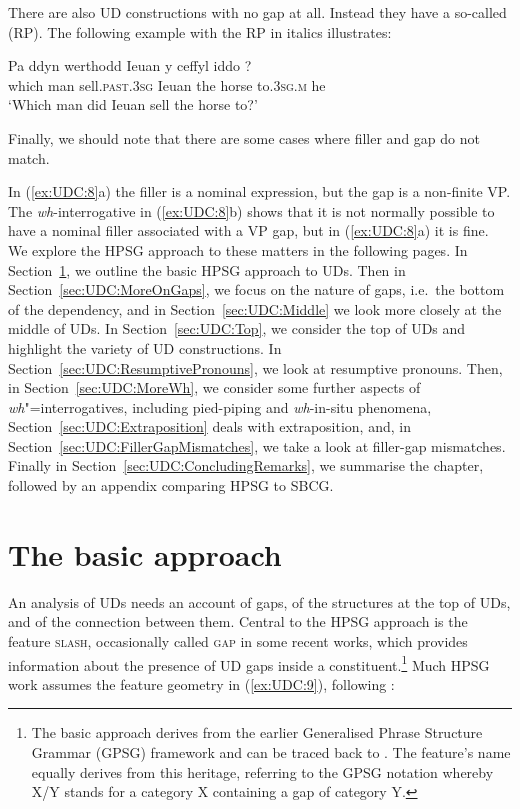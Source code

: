 \documentclass[output=paper,biblatex,babelshorthands,newtxmath,draftmode,colorlinks,citecolor=brown]{langscibook}
\begin{document}
\noindent 
There are also UD constructions with no gap at all. Instead they
have a so-called  (RP). The following 
example with the RP in italics illustrates:

\ea
\label{ex:UDC:7}
\gll Pa    ddyn werthodd               Ieuan y   ceffyl iddo             ?\\
     which man  sell.\textsc{past.3sg} Ieuan the horse  to\textsc{.3sg.m} he\\
\glt `Which man did Ieuan sell the horse to?'
\z

\largerpage
\noindent
Finally, we should note that there are some cases where filler and gap
do not match.

\eal
\label{ex:UDC:8} 
\zl

\noindent 
In (\ref{ex:UDC:8}a) the filler is a nominal expression, but the
gap is a non-finite VP. The \emph{wh}-interrogative in
(\ref{ex:UDC:8}b) shows that it is not normally possible to have a
nominal filler associated with a VP gap, but in (\ref{ex:UDC:8}a) it
is fine.  We explore the HPSG approach to these matters in the
following pages. In Section~\ref{sec:UDC:BasicApproach}, we outline
the basic HPSG approach to UDs. Then in
Section~\ref{sec:UDC:MoreOnGaps}, we focus on the nature of gaps,
i.e.\ the bottom of the dependency, and in Section~\ref{sec:UDC:Middle}
we look more closely at the middle of UDs. In
Section~\ref{sec:UDC:Top}, we consider the top of UDs and highlight
the variety of UD constructions. In
Section~\ref{sec:UDC:ResumptivePronouns}, we look at resumptive
pronouns. Then, in Section~\ref{sec:UDC:MoreWh}, we consider some
further aspects of \emph{wh}"=interrogatives, including pied-piping
and \emph{wh}-in-situ phenomena, Section~\ref{sec:UDC:Extraposition} deals with extraposition, and, in
Section~\ref{sec:UDC:FillerGapMismatches}, we take a look at
filler-gap mismatches.  Finally in
Section~\ref{sec:UDC:ConcludingRemarks}, we summarise the chapter,
followed by an appendix comparing HPSG to SBCG.  

\section{The basic approach}
\label{sec:UDC:BasicApproach} 

An analysis of UDs needs an
account of gaps, of the structures at the top of UDs, and of the
connection between them. Central to the HPSG approach is the feature
\textsc{slash}, occasionally called \textsc{gap} in some recent works,
which provides information about the presence of UD gaps inside a
constituent.\footnote{The basic approach derives from the earlier
  Generalised Phrase Structure Grammar (GPSG) framework
  \citep*{Gazdar85} and can be traced back to \citet{gazdar_g81}. The
  feature's name equally derives from this heritage, referring to the
  GPSG notation whereby X/Y stands for a category X containing a gap of
  category Y.} 
Much HPSG work assumes the feature geometry {in} (\ref{ex:UDC:9}), following \citet[Chapter~4]{Pollard:Sag:94}:
\end{document}

